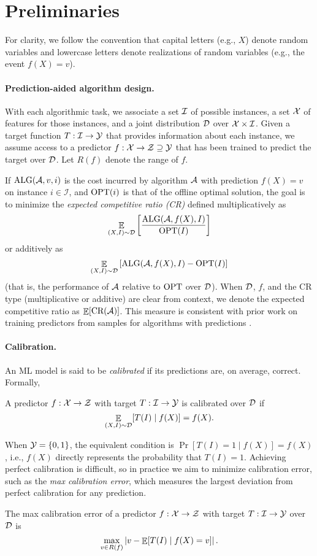 \section{Preliminaries}
For clarity, we follow the convention that capital letters (e.g., $X$) denote random variables and lowercase letters denote realizations of random variables  (e.g., the event $f(X)=v$).

\paragraph{Prediction-aided algorithm design.}
 With each algorithmic task, we associate a set $\mathcal{I}$ of possible instances, a set $\mathcal{X}$ of features for those instances, and a joint distribution $\mathcal{D}$ over $\mathcal{X} \times \mathcal{I}$. Given a target function $T:\mathcal{I} \to \mathcal{Y}$ that provides information about each instance, we assume access to a predictor $f:\mathcal{X} \to \mathcal{Z} \supseteq\mathcal{Y}$ that has been trained to predict the target over $\mathcal{D}$. Let $R(f)$ denote the range of $f$. 

 If $\textnormal{ALG}(\mathcal{A}, v, i)$ is the cost incurred by algorithm $\mathcal{A}$ with prediction $f(X)=v$ on instance $i \in \mathcal{I}$, and $\textnormal{OPT}(i)$ is that of the offline optimal solution, the goal is to minimize the \textit{expected competitive ratio (CR)} defined multiplicatively as
 \begin{equation*} \label{eq: mult-exp--cr}
     \mathop{\mathbb{E}}_{(X, I) \sim \mathcal{D}}\left[\frac{\textnormal{ALG}(\mathcal{A}, f(X), I)}{\textnormal{OPT}(I)}\right]
 \end{equation*}
or additively as\[\mathop{\mathbb{E}}_{(X, I) \sim \mathcal{D}}\left[\textnormal{ALG}(\mathcal{A}, f(X), I) -\textnormal{OPT}(I)\right]\]
(that is, the performance of $\mathcal{A}$ relative to $\textnormal{OPT}$ over $\mathcal{D}$). When $\mathcal{D}$, $f$, and the CR type (multiplicative or additive) are clear from context, we denote the expected competitive ratio as $\mathop{\mathbb{E}}[\textnormal{CR}(\mathcal{A})]$. This measure is consistent with prior work on training predictors from samples for algorithms with predictions \citep{Anand20:Customizing}.


\paragraph{Calibration.}
An ML model is said to be \emph{calibrated} if its predictions are, on average, correct. Formally,
\begin{definition} \label{def: calibration}
    A predictor $f: \mathcal{X} \to \mathcal{Z}$ with target $T: \mathcal{I} \to \mathcal{Y}$ is calibrated over $\mathcal{D}$ if
    \[\mathop{\mathbb{E}}_{(X, I) \sim \mathcal{D}}[T(I) \mid f(X)] = f(X).\]
\end{definition}
When $\mathcal{Y} = \{0,1\}$, the equivalent condition is $\Pr[T(I)=1 \mid f(X)] = f(X)$, i.e., $f(X)$ directly represents the probability that $T(I)=1$. Achieving perfect calibration is difficult, so in practice we aim to minimize calibration error, such as the \emph{max calibration error}, which measures the largest deviation from perfect calibration for any prediction.
\begin{definition} \label{def: k1-cal-error}
     The max calibration error of a predictor $f: \mathcal{X} \to \mathcal{Z}$ with target $T:\mathcal{I} \to \mathcal{Y}$ over $\mathcal{D}$ is
     \[\max_{v \in R(f)} \left|v -\mathop{\mathbb{E}}[T(I) \mid f(X) = v]\right|.\]
\end{definition}